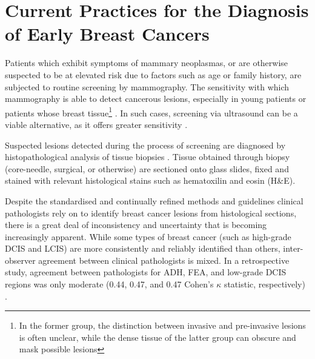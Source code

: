 
\section{Current Practices for the Diagnosis of Early Breast Cancers}
Patients which exhibit symptoms of mammary neoplasmas, or are otherwise suspected to be at elevated risk due to factors such as age or family history, are subjected to routine screening by mammography. The sensitivity with which mammography is able to detect cancerous lesions, especially in young patients or patients whose breast tissue\footnote{In the former group, the distinction between invasive and pre-invasive lesions is often unclear, while the dense tissue of the latter group can obscure and mask possible lesions} \citep{ayvaci2014}. In such cases, screening via ultrasound can be a viable alternative, as it offers greater sensitivity \citep{nothacker2009}.

Suspected lesions detected during the process of screening are diagnosed by histopathological analysis of tissue biopsies \citep{nccn}. Tissue obtained through biopsy (core-needle, surgical, or otherwise) are sectioned onto glass slides, fixed and stained with relevant histological stains such as hematoxilin and eosin (H\&E).


Despite the standardised and continually refined methods and guidelines clinical pathologists rely on to identify breast cancer lesions from histological sections, there is a great deal of inconsistency and uncertainty that is becoming increasingly apparent. While some types of breast cancer (such as high-grade DCIS and LCIS) are more consistently and reliably identified than others, inter-observer agreement between clinical pathologists is mixed. In a retrospective study, agreement between pathologists for ADH, FEA, and low-grade DCIS regions was only moderate (0.44, 0.47, and 0.47 Cohen's $\kappa$ statistic, respectively) \citep{gomes2014}.\par
